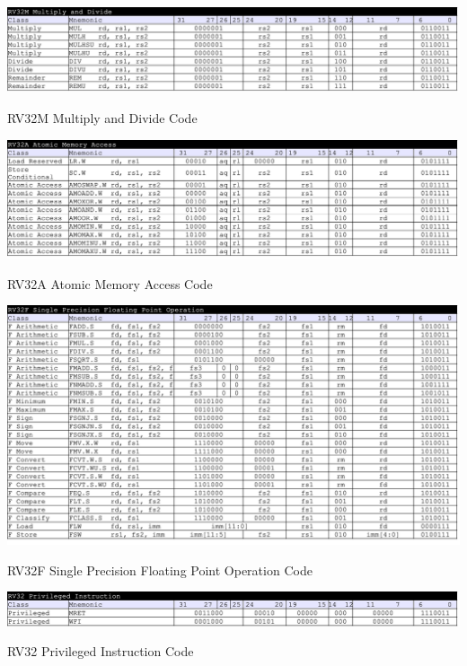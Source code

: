 \begin{table}[H]
    \includegraphics[width=1.00\columnwidth]{./Table/ISACode_RV32M.png}
    \caption{RV32M Multiply and Divide Code}
    \label{tb:ISACode_RV32M}
\end{table}

\begin{table}[H]
    \includegraphics[width=1.00\columnwidth]{./Table/ISACode_RV32A.png}
    \caption{RV32A Atomic Memory Access Code}
    \label{tb:ISACode_RV32A}
\end{table}

\begin{table}[H]
    \includegraphics[width=1.00\columnwidth]{./Table/ISACode_RV32F.png}
    \caption{RV32F Single Precision Floating Point Operation Code}
    \label{tb:ISACode_RV32F}
\end{table}

\begin{table}[H]
    \includegraphics[width=1.00\columnwidth]{./Table/ISACode_RV32Priviledged.png}
    \caption{RV32 Privileged Instruction Code}
    \label{tb:ISACode_RV32Priviledged}
\end{table}




